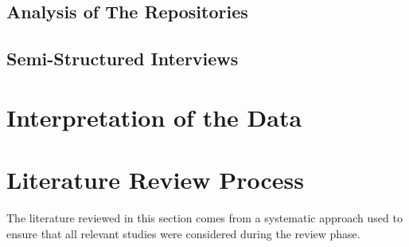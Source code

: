 \subsection{Analysis of The Repositories}

\subsection{Semi-Structured Interviews} \label{semi-structured_interviews}

\section{Interpretation of the Data}








\section{Literature Review Process} \label{literature_review_process}
The literature reviewed in this section comes from a systematic approach used to ensure that all relevant studies were considered during the review phase.

